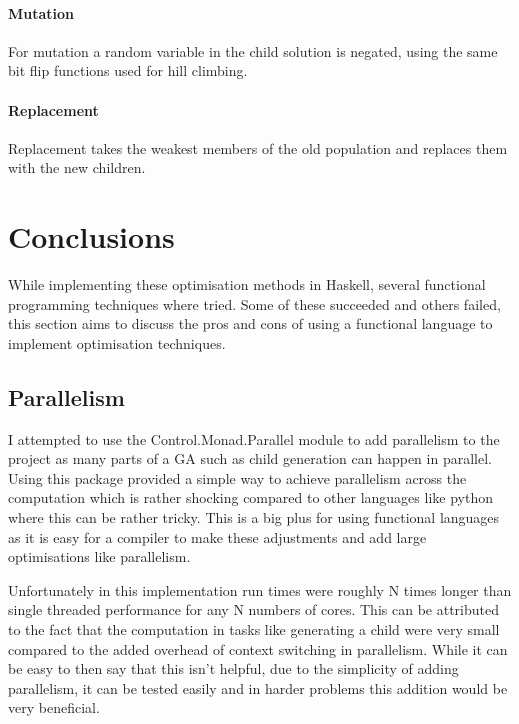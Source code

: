 \documentclass[a4paper]{article}
\begin{document}
\paragraph{Mutation}\vspace*{-4mm}
For mutation a random variable in the child solution is negated, using the same bit flip functions used for hill climbing.
\paragraph{Replacement}\vspace*{-4mm}
Replacement takes the weakest members of the old population and replaces them with the new children.

\section{Conclusions}
While implementing these optimisation methods in Haskell, several functional programming techniques where tried.
Some of these succeeded and others failed, this section aims to discuss the pros and cons of using a functional language to implement optimisation techniques.

\subsection{Parallelism}
I attempted to use the Control.Monad.Parallel module to add parallelism to the project as many parts of a GA such as child generation can happen in parallel.
Using this package provided a simple way to achieve parallelism across the computation which is rather shocking compared to other languages like python where this can be rather tricky.
This is a big plus for using functional languages as it is easy for a compiler to make these adjustments and add large optimisations like parallelism.
\par
Unfortunately in this implementation run times were roughly N times longer than single threaded performance for any N numbers of cores.
This can be attributed to the fact that the computation in tasks like generating a child were very small compared to the added overhead of context switching in parallelism.
While it can be easy to then say that this isn't helpful, due to the simplicity of adding parallelism, it can be tested easily and in harder problems this addition would be very beneficial.
\end{document}
